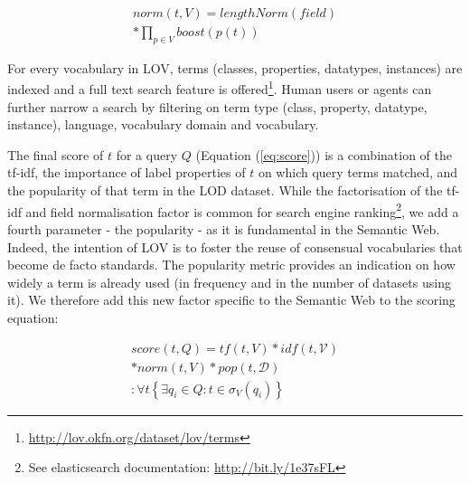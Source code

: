 \documentclass{iosart2c}
\begin{document}
\begin{equation}\label{eq:norm}
\begin{split}
norm(t,V) =  lengthNorm(field) \\
* \prod_{p \in V} boost(p(t))
\end{split}
\end{equation}

For every vocabulary in LOV, terms (classes, properties, datatypes, instances) are indexed and a full text search feature is offered\footnote{\url{http://lov.okfn.org/dataset/lov/terms}}. Human users or agents can further narrow a search by filtering on term type (class, property, datatype, instance), language, vocabulary domain and vocabulary.

The final score of $t$ for a query $Q$ (Equation (\ref{eq:score})) is a combination of the tf-idf, the importance of label properties of $t$ on which query terms matched, and the popularity of that term in the LOD dataset.  While the factorisation of the tf-idf and field normalisation factor is common for search engine ranking\footnote{See elasticsearch documentation: \url{http://bit.ly/1e37sFL}}, we add a fourth parameter - the popularity - as it is fundamental in the Semantic Web. Indeed, the intention of LOV is to foster the reuse of consensual vocabularies that become de facto standards. The popularity metric provides an indication on how widely a term is already used (in frequency and in the number of datasets using it). We therefore add this new factor specific to the Semantic Web to the scoring equation:
 

\begin{equation}\label{eq:score}
\begin{split}
score(t,Q) =tf(t,V) * idf(t,\mathcal{V}) \\
* norm(t,V) * pop(t,\mathcal{D})\\
: \forall t\left\{\exists q_i \in Q: t \in \sigma_V(q_i)\right\}
\end{split}
\end{equation}
\end{document}
